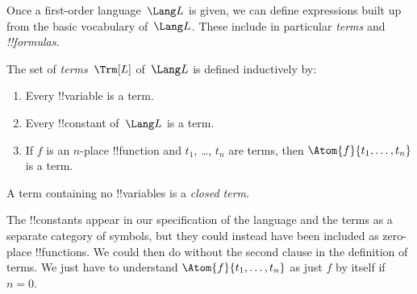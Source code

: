\documentclass[../../../include/open-logic-section]{subfiles}
\begin{document}


Once a first-order language~$\Lang L$ is given, we can define
expressions built up from the basic vocabulary of~$\Lang L$.  These
include in particular \emph{terms} and \emph{!!{formula}s}.

\begin{defn}[Terms]
The set of \emph{terms}~$\Trm[L]$ of~$\Lang L$ is
defined inductively by:
\begin{enumerate}
\item Every !!{variable} is a term.
\item Every !!{constant} of~$\Lang L$ is a term.
\item If $f$ is an $n$-place !!{function} and $t_1$, \dots, $t_n$
  are terms, then $\Atom{f}{t_1, \ldots, t_n}$ is a term.
\end{enumerate}
A term containing no !!{variable}s is a \emph{closed term}.
\end{defn}

\begin{explain}
The !!{constant}s appear in our specification of the language and the
terms as a separate category of symbols, but they could instead have
been included as zero-place !!{function}s.  We could then do without
the second clause in the definition of terms. We just have to
understand $\Atom{f}{t_1, \ldots, t_n}$ as just $f$ by itself if $n =
0$.
\end{explain}
\end{document}
